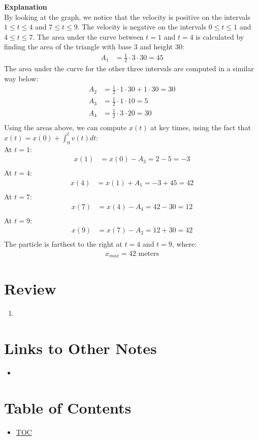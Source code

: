 \textbf{Explanation}\\
By looking at the graph, we notice that the velocity is positive on the intervals $1 \leq t \leq 4$ and $7 \leq t \leq 9$. The velocity is negative on the intervals $0 \leq t \leq 1$ and $4 \leq t \leq 7$.
The area under the curve between $t = 1$ and $t=4$ is calculated by finding the area of the triangle with base 3 and height 30:
\begin{align*}
  A_1 &= \frac{1}{2} \cdot 3 \cdot 30 = 45
\end{align*}
The area under the curve for the other three intervals are computed in a similar way below:
\begin{align*}
  A_2 &= \frac{1}{2} \cdot 1 \cdot 30 + 1 \cdot 30 = 30\\
  A_3 &= \frac{1}{2} \cdot 1 \cdot 10 = 5\\
  A_4 &= \frac{1}{2} \cdot 3 \cdot 20 = 30\\
\end{align*}
Using the areas above, we can compute $x(t)$ at key times, using the fact that $x(t) = x(0) + \int_0^t v(t) dt$:\\
At $t=1$:
\begin{align*}
  x(1) &= x(0) - A_3 = 2 - 5 = -3\\
\end{align*}
At $t = 4$:
\begin{align*}
  x(4) &= x(1) + A_1 = -3 + 45 = 42\\
\end{align*}
At $t = 7$:
\begin{align*}
  x(7) &= x(4) - A_4 = 42 - 30 = 12\\
\end{align*}
At $t = 9$:
\begin{align*}
  x(9) &= x(7) - A_2 = 12 + 30 = 42\\
\end{align*}
The particle is farthest to the right at $t = 4$ and $t = 9$, where:
\begin{align*}
  x_{max} = 42 \text{ meters}
\end{align*}

\section*{Review}
\begin{enumerate}
  \item 
\end{enumerate}


\section*{Links to Other Notes}
\begin{itemize}
  \item \hyperref[]{}
\end{itemize}

\section*{Table of Contents}

\begin{itemize}
  \item \hyperref[toc]{TOC}
\end{itemize}

